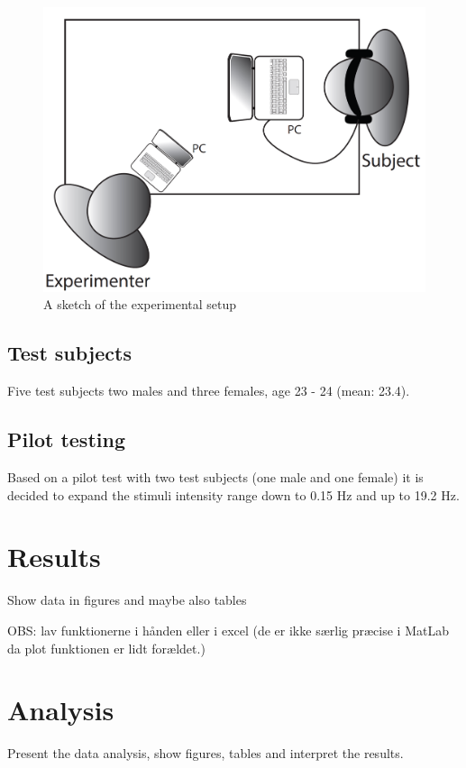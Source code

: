 \begin{figure}[htb]
\centering
\includegraphics[width = \textwidth]{Figure/Vores_Figurer/experiment.png} 
\caption{A sketch of the experimental setup}
\label{fig:experiment}
\end{figure}

\subsection*{Test subjects}
Five test subjects two males and three females, age 23 - 24 (mean: 23.4).

\subsection*{Pilot testing}
Based on a pilot test with two test subjects (one male and one female) it is decided to expand the stimuli intensity range down to 0.15 Hz and up to 19.2 Hz.

\section*{Results}
Show data in figures and maybe also tables

OBS: lav funktionerne i hånden eller i excel (de er ikke særlig præcise i MatLab da plot funktionen er lidt forældet.)

\section*{Analysis}
Present the data analysis, show figures, tables and interpret the results.

